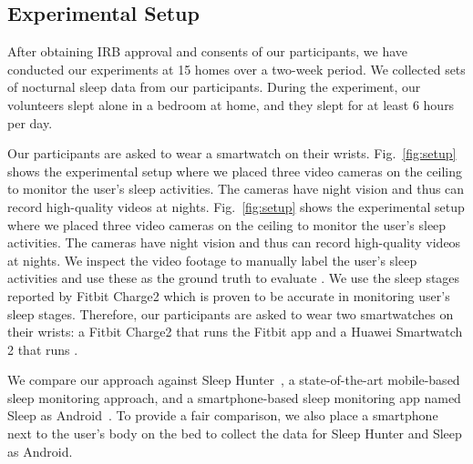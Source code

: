 \subsection{Experimental Setup}
After obtaining IRB approval and consents of our participants, we have conducted our experiments at 15 homes over a two-week period. We
collected  sets of nocturnal sleep data from our participants. During the experiment, our volunteers slept alone in a bedroom at
home, and they slept for at least 6 hours per day.


Our participants are asked to wear a smartwatch on their wrists. Fig.~\ref{fig:setup} shows the experimental setup where we placed three
video cameras on the ceiling to monitor the user's sleep activities. The cameras have night vision and thus can record high-quality videos
at nights.  Fig.~\ref{fig:setup} shows the experimental setup where we placed three video cameras on the ceiling to monitor the user's
sleep activities. The cameras have night vision and thus can record high-quality videos at nights. We inspect the video footage to manually
label the user's sleep activities and use these as the ground truth to evaluate \systemname. We use the sleep stages reported by Fitbit
Charge2 which is proven to be accurate in monitoring user's sleep stages\FIXME{~\cite{}}. Therefore, our participants are asked to wear two
smartwatches on their wrists: a Fitbit Charge2 that runs the Fitbit app and a Huawei Smartwatch 2 that runs \systemname.

We compare our approach against Sleep Hunter~\cite{gu2016sleep}, a state-of-the-art mobile-based sleep monitoring approach, and a
smartphone-based sleep monitoring app named Sleep as Android~\cite{SleepAndroid}. To provide a fair comparison, we also place a smartphone
next to the user's body on the bed to collect the data for Sleep Hunter and Sleep as Android.
